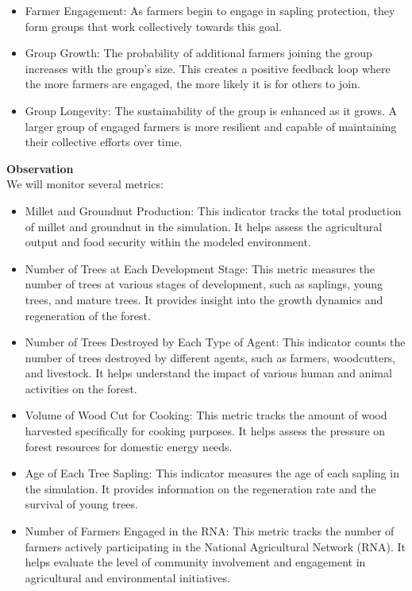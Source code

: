 \documentclass{article}
\begin{document}
        \begin{itemize}
            \item Farmer Engagement: As farmers begin to engage in sapling protection, they form groups that work collectively towards this goal.
            \item Group Growth: The probability of additional farmers joining the group increases with the group's size. This creates a positive feedback loop where the more farmers are engaged, the more likely it is for others to join.
            \item Group Longevity: The sustainability of the group is enhanced as it grows. A larger group of engaged farmers is more resilient and capable of maintaining their collective efforts over time.\\
        \end{itemize}


        \textbf{Observation}\\


        We will monitor several metrics:

        \begin{itemize}
            \item Millet and Groundnut Production: This indicator tracks the total production of millet and groundnut in the simulation. It helps assess the agricultural output and food security within the modeled environment.
            \item Number of Trees at Each Development Stage: This metric measures the number of trees at various stages of development, such as saplings, young trees, and mature trees. It provides insight into the growth dynamics and regeneration of the forest.
            \item Number of Trees Destroyed by Each Type of Agent: This indicator counts the number of trees destroyed by different agents, such as farmers, woodcutters, and livestock. It helps understand the impact of various human and animal activities on the forest.
            \item Volume of Wood Cut for Cooking: This metric tracks the amount of wood harvested specifically for cooking purposes. It helps assess the pressure on forest resources for domestic energy needs.
            \item Age of Each Tree Sapling: This indicator measures the age of each sapling in the simulation. It provides information on the regeneration rate and the survival of young trees.
            \item Number of Farmers Engaged in the RNA: This metric tracks the number of farmers actively participating in the National Agricultural Network (RNA). It helps evaluate the level of community involvement and engagement in agricultural and environmental initiatives.\\
        \end{itemize}
\end{document}
